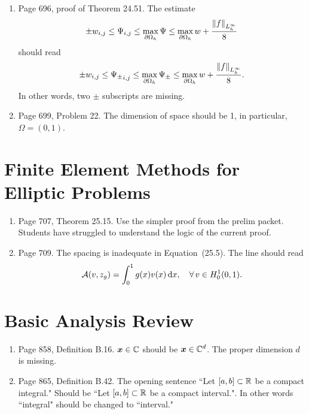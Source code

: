 \documentclass{book}
\begin{document}
\begin{enumerate}
	\item
Page 696, proof of Theorem 24.51. The estimate 
	\[
\pm w_{i,j} \le \Psi_{i,j} \le \max_{\partial\Omega_h} \Psi \le \max_{\partial\Omega_h} w + \frac{\left\| f \right\|_{L_h^\infty}}{8}
	\]
should read
	\[
\pm w_{i,j} \le {\Psi_{\pm}}_{i,j} \le \max_{\partial\Omega_h} \Psi_{\pm} \le \max_{\partial\Omega_h} w + \frac{\left\| f \right\|_{L_h^\infty}}{8}.
	\]
In other words, two $\pm$ subscripts are missing.
 
	\item
Page 699, Problem 22. The dimension of space should be 1, in particular, $\Omega = (0,1)$.

	\end{enumerate}
	
\chapter{Finite Element Methods for Elliptic Problems}

	\begin{enumerate}
	\item
Page 707, Theorem 25.15. Use the simpler proof from the prelim packet. Students have struggled to understand the logic of the current proof.
	\item
Page 709. The spacing is inadequate in Equation~(25.5). The line should read
	\[
\mathcal{A}(v,z_g) = \int_0^1 g(x) v(x)\, \textup{d} x, \quad \forall \, v\in H_0^1(0,1).
	\]
	\end{enumerate}
	
	\appendix
	
	\setcounter{chapter}{1}
	
\chapter{Basic Analysis Review}

	\begin{enumerate}
	\item
Page 858, Definition B.16. $\boldsymbol{x}\in\mathbb C$ should be  $\boldsymbol{x}\in\mathbb C^d$. The proper dimension $d$ is missing.

	\item
Page 865, Definition B.42. The opening sentence ``Let $[a,b]\subset \mathbb R$ be a compact integral." Should be ``Let $[a,b]\subset \mathbb R$ be a compact interval.". In other words ``integral" should be changed to ``interval." 
	\end{enumerate}

	
\end{document}
